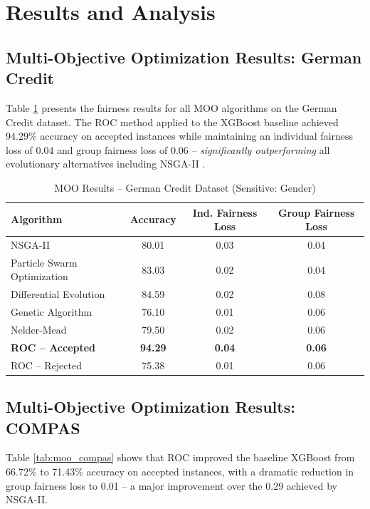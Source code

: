 \documentclass[12pt,a4paper]{article}
\begin{document}
\section{Results and Analysis}
\label{sec:moo_results}

\subsection{Multi-Objective Optimization Results: German Credit}

Table \ref{tab:moo_german} presents the fairness results for all MOO algorithms on the German Credit dataset. The ROC method applied to the XGBoost baseline achieved 94.29\% accuracy on accepted instances while maintaining an individual fairness loss of 0.04 and group fairness loss of 0.06 -- \textit{significantly outperforming} all evolutionary alternatives including NSGA-II \cite{rN2024multiobj}.

\begin{table}[h]
\centering
\caption{MOO Results -- German Credit Dataset (Sensitive: Gender)}
\label{tab:moo_german}
\begin{tabular}{lccc}
\toprule
\textbf{Algorithm} & \textbf{Accuracy} & \textbf{Ind. Fairness Loss} & \textbf{Group Fairness Loss} \\
\midrule
NSGA-II                     & 80.01 & 0.03 & 0.04 \\
Particle Swarm Optimization & 83.03 & 0.02 & 0.04 \\
Differential Evolution      & 84.59 & 0.02 & 0.08 \\
Genetic Algorithm           & 76.10 & 0.01 & 0.06 \\
Nelder-Mead                 & 79.50 & 0.02 & 0.06 \\
\midrule
\textbf{ROC -- Accepted}    & \textbf{94.29} & \textbf{0.04} & \textbf{0.06} \\
ROC -- Rejected             & 75.38 & 0.01 & 0.06 \\
\bottomrule
\end{tabular}
\end{table}

\subsection{Multi-Objective Optimization Results: COMPAS}

Table \ref{tab:moo_compas} shows that ROC improved the baseline XGBoost from 66.72\% to 71.43\% accuracy on accepted instances, with a dramatic reduction in group fairness loss to 0.01 -- a major improvement over the 0.29 achieved by NSGA-II.
\end{document}
